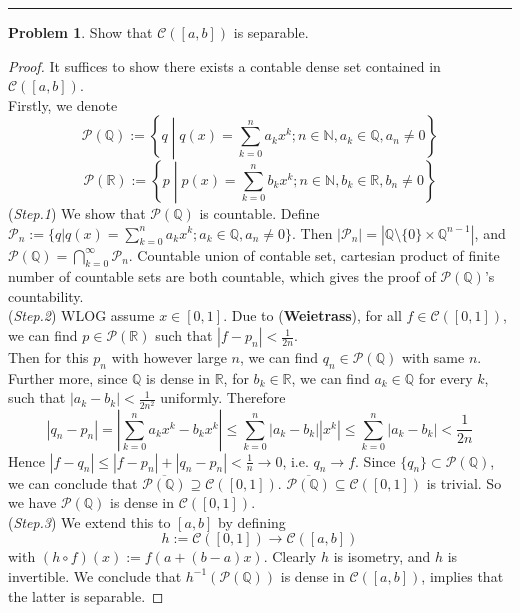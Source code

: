 \documentclass[a4paper, 10pt]{article}
\theoremstyle{definition}
\newtheorem{problem}{Problem}
\theoremstyle{hSol}
\begin{document}
\noindent\rule{16cm}{0.4pt}

\begin{problem} Show that $\mathcal{C}([a,b])$ is separable.
\end{problem}
\begin{proof} It suffices to show there exists a contable dense set contained in $\mathcal{C}([a,b])$.\\
Firstly, we denote
$$
\mathcal{P}(\mathbb{Q}):=\left\{q\middle|q(x)=\sum_{k=0}^{n} a_k x^k; n\in \mathbb{N}, a_k\in \mathbb{Q}, a_n\ne 0\right\}
$$
$$
\mathcal{P}(\mathbb{R}):=\left\{p\middle|p(x)=\sum_{k=0}^{n} b_k x^k; n\in \mathbb{N}, b_k\in \mathbb{R}, b_n\ne 0\right\}
$$
(\textit{Step.1}) We show that $\mathcal{P}(\mathbb{Q})$ is countable. Define $\mathcal{P}_n:=\{q|q(x)=\sum_{k=0}^{n} a_k x^k; a_k\in \mathbb{Q}, a_n\ne 0\}$. Then $|\mathcal{P}_n|=|\mathbb{Q}\setminus \{0\} \times \mathbb{Q}^{n-1}|$, and $\mathcal{P}(\mathbb{Q})=\bigcap_{k=0}^{\infty} \mathcal{P}_n$. Countable union of contable set, cartesian product of finite number of countable sets are both countable, which gives the proof of $\mathcal{P}(\mathbb{Q})$'s countability. \\
(\textit{Step.2}) WLOG assume $x\in [0,1]$. Due to (\textbf{Weietrass}), for all $f\in \mathcal{C}([0,1])$, we can find $p\in \mathcal{P}(\mathbb{R})$ such that $|f-p_n|<\frac{1}{2n}$.\\
Then for this $p_n$ with however large $n$, we can find $q_n \in \mathcal{P}(\mathbb{Q})$ with same $n$. Further more, since $\mathbb{Q}$ is dense in $\mathbb{R}$, for $b_k \in \mathbb{R}$, we can find $a_k \in \mathbb{Q}$ for every $k$, such that $|a_k-b_k|<\frac{1}{2n^2}$ uniformly. Therefore
\begin{equation}
  |q_n-p_n|=\left|\sum_{k=0}^{n} a_k x^k-b_kx^k\right| \leq \sum_{k=0}^n |a_k-b_k||x^k| \leq \sum_{k=0}^n |a_k -b_k| < \frac{1}{2n}
\end{equation}
Hence $|f-q_n|\leq |f-p_n|+|q_n-p_n|<\frac{1}{n} \to 0$, i.e. $q_n\to f$. Since $\{q_n\} \subset \mathcal{P}(\mathbb{Q})$, we can conclude that $\overline{\mathcal{P}(\mathbb{Q})} \supseteq \mathcal{C}([0,1])$. $\overline{\mathcal{P}(\mathbb{Q})} \subseteq \mathcal{C}([0,1])$ is trivial. So we have $\mathcal{P}(\mathbb{Q})$ is dense in $\mathcal{C}([0,1])$. \\
(\textit{Step.3}) We extend this to $[a,b]$ by defining
$$
h:=\mathcal{C}([0,1])\to \mathcal{C}([a,b])
$$
with $(h\circ f)(x):=f(a+(b-a)x)$. Clearly $h$ is isometry, and $h$ is invertible. We conclude that $h^{-1}(\mathcal{P}(\mathbb{Q}))$ is dense in $\mathcal{C}([a,b])$, implies that the latter is separable.
\end{proof}
\end{document}
